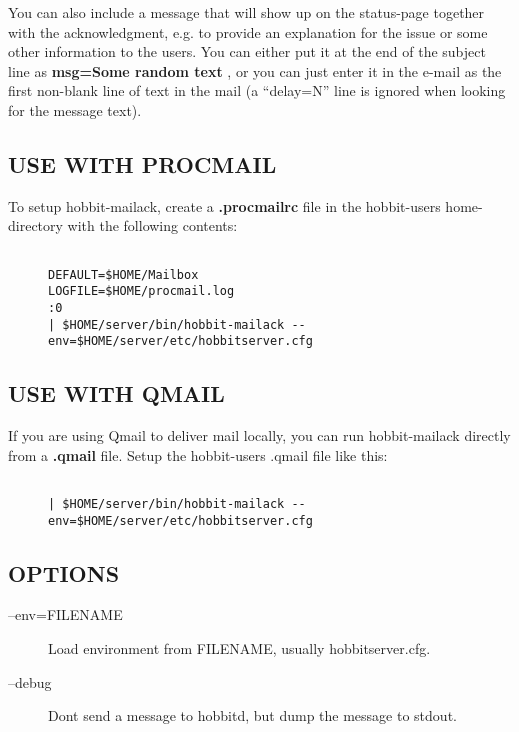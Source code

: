   You can also include a message that will show up on the status-page together with the acknowledgment, e.g. to provide an explanation for the issue or some other information to the users. You can either put it at the end of the subject line as \textbf{msg=Some random text}
, or you can just enter it in the e-mail as the first non-blank line of text in the mail (a ``delay=N'' line is ignored when looking for the message text). 


 
\subsection{USE WITH PROCMAIL}
 To setup hobbit-mailack, create a \textbf{.procmailrc}
 file in the hobbit-users home-directory with the following contents: \begin{description}
\item[]\begin{verbatim}

DEFAULT=$HOME/Mailbox
LOGFILE=$HOME/procmail.log
:0
| $HOME/server/bin/hobbit-mailack --env=$HOME/server/etc/hobbitserver.cfg

\end{verbatim}


 


\end{description}
\subsection{USE WITH QMAIL}
 If you are using Qmail to deliver mail locally, you can run hobbit-mailack directly from a \textbf{.qmail}
 file. Setup the hobbit-users .qmail file like this: \begin{description}
\item[]\begin{verbatim}

| $HOME/server/bin/hobbit-mailack --env=$HOME/server/etc/hobbitserver.cfg

\end{verbatim}


 


\end{description}
\subsection{OPTIONS}
\begin{description}
\item[--env=FILENAME] Load environment from FILENAME, usually hobbitserver.cfg. 

 

\item[--debug] Dont send a message to hobbitd, but dump the message to stdout. 

 


\end{description}
